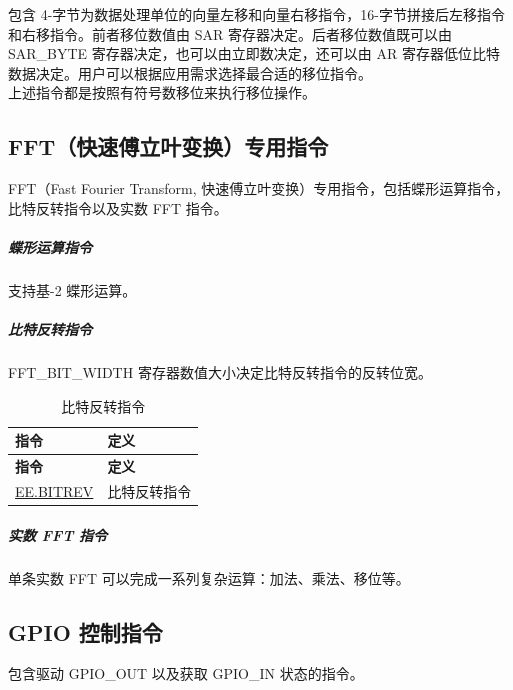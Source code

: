 \documentclass[main\_\_CN.tex]{subfiles}
\begin{document}
\label{sec:pie-shift-instrucitons}

包含 4-字节为数据处理单位的向量左移和向量右移指令，16-字节拼接后左移指令和右移指令。前者移位数值由 SAR 寄存器决定。后者移位数值既可以由 SAR\_BYTE 寄存器决定，也可以由立即数决定，还可以由 AR 寄存器低位比特数据决定。用户可以根据应用需求选择最合适的移位指令。\\
上述指令都是按照有符号数移位来执行移位操作。




\subsection{FFT（快速傅立叶变换）专用指令}

\label{sec:pie-fft-instrucitons}

FFT（Fast Fourier Transform, 快速傅立叶变换）专用指令，包括蝶形运算指令，比特反转指令以及实数 FFT 指令。
\subparagraph{蝶形运算指令}
支持基-2 蝶形运算。



\subparagraph{比特反转指令}

FFT\_BIT\_WIDTH 寄存器数值大小决定比特反转指令的反转位宽。

\begin{longtable}[c]{|l|m{10cm}|}
    \caption{比特反转指令}
    \label{tab:pie-bitrev-instructions}\\
    \hline
    \rowcolor{lightgray}
    \textbf{指令} & \textbf{定义} \\\hline
    \endfirsthead
    \rowcolor{lightgray}
    \textbf{指令} & \textbf{定义} \\\hline
    \endhead
    \endfoot

    \hyperref[instruction:EEBITREV]{EE.BITREV} & 比特反转指令
    \\\hline
\end{longtable}


\subparagraph{实数 FFT 指令}

单条实数 FFT 可以完成一系列复杂运算：加法、乘法、移位等。




\subsection{GPIO 控制指令}
\label{sec:pie-gpio-instrucitons}

包含驱动 GPIO\_OUT 以及获取 GPIO\_IN 状态的指令。
\end{document}
